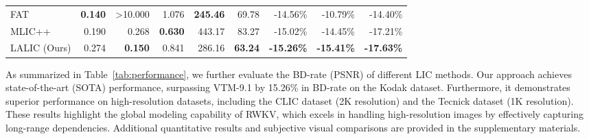 \begin{table*}[t]
\begin{tabular}{lrrrrrrrr}
FAT~\cite{Li.2023.FAT}                    & \textbf{0.140}          & \textgreater 10.000     & 1.076                   & \textbf{245.46}           & 69.78                      & -14.56\%                  & -10.79\%                 & -14.40\%                    \\
MLIC++~\cite{Jiang.2023.MLICpp}           & 0.190                   & 0.268                   & \textbf{0.630}          & 443.17                    & 83.27                      & -15.02\%                  & -14.45\%                 & -17.21\%                    \\ \hline
LALIC (Ours)                              & 0.274                   & \textbf{0.150}          & 0.841                   & 286.16                    & \textbf{63.24}             & \textbf{-15.26\%}         & \textbf{-15.41\%}        & \textbf{-17.63\%}           \\ \hline
\end{tabular}

    \caption{Rate-distortion (R-D) performance and computational complexity of various learned image compression models on the Kodak dataset, evaluated on an NVIDIA RTX 4090 GPU. Lower BD-Rate values indicate better R-D performance. Bold font denote the best performance among the recent SOTA methods. ”-” indicates an unavailable result. Note that we re-run the FAT method using the official github code. More details will be discussed in the supplementary materials.}
    \label{tab:performance}
\end{table*}



As summarized in Table~\ref{tab:performance}, we further evaluate the BD-rate (PSNR) of different LIC methods. Our approach achieves state-of-the-art (SOTA) performance, surpassing VTM-9.1 by 15.26\% in BD-rate on the Kodak dataset. Furthermore, it demonstrates superior performance on high-resolution datasets, including the CLIC dataset (2K resolution) and the Tecnick dataset (1K resolution). These results highlight the global modeling capability of RWKV, which excels in handling high-resolution images by effectively capturing long-range dependencies. Additional quantitative results and subjective visual comparisons are provided in the supplementary materials.

